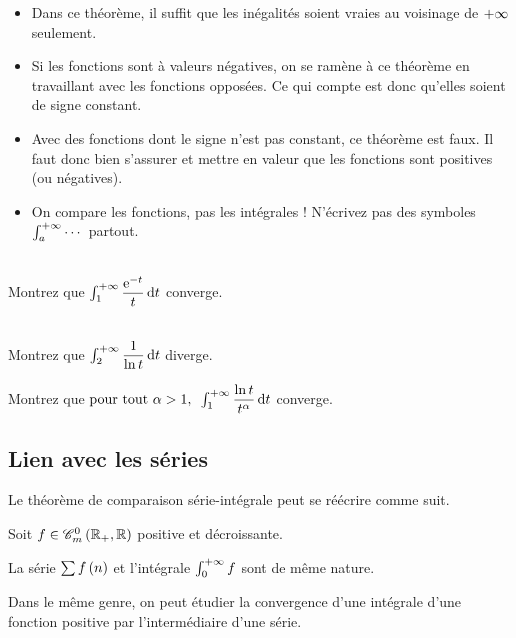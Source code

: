 \begin{rem}
\begin{itemize}
    \item Dans ce théorème, il suffit que les inégalités soient vraies au voisinage de \(+\infty\) seulement. \\
    \item Si les fonctions sont à valeurs négatives, on se ramène à ce théorème en travaillant avec les fonctions opposées. Ce qui compte est donc qu'elles soient de signe constant. \\
    \item Avec des fonctions dont le signe n'est pas constant, ce théorème est faux. Il faut donc bien s'assurer et mettre en valeur que les fonctions sont positives (ou négatives). \\
    \item On compare les fonctions, pas les intégrales ! N'écrivez pas des symboles \(\int_a^{+\infty}\cdots\) partout.
\end{itemize}
\end{rem}

\begin{exo}~\\
Montrez que \(\int_1^{\pinf}\dfrac{\e{-t}}{t}\odif{t}\) converge.
\end{exo}

\begin{exo}~\\
Montrez que \(\int_2^{\pinf}\dfrac{1}{\ln t}\odif{t}\) diverge.
\end{exo}

\begin{exo}
Montrez que \(\quantifs{\tpt\alpha>1}\int_1^{\pinf}\dfrac{\ln t}{t^\alpha}\odif{t}\) converge.
\end{exo}

\subsection{Lien avec les séries}

Le théorème de comparaison série-intégrale peut se réécrire comme suit.

\begin{prop}
Soit \(f\in\contm[\Rp][\R]\) positive et décroissante.

La série \(\sum f\left(n\right)\) et l'intégrale \(\int_0^{+\infty}f\) sont de même nature.
\end{prop}

Dans le même genre, on peut étudier la convergence d'une intégrale d'une fonction positive par l'intermédiaire d'une série.


